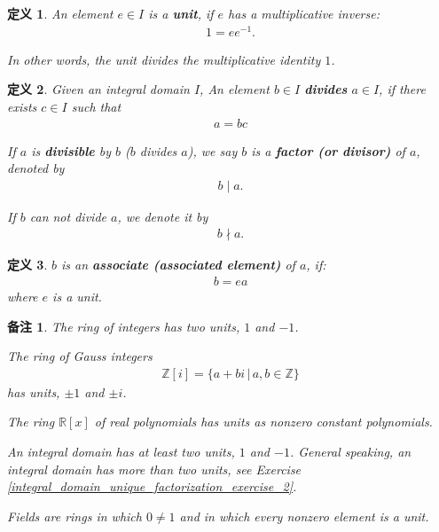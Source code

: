 \documentclass[utf8]{ctexbook}
\newtheorem{definition}{定义}[section]
\newtheorem{memo}{备注}[section]
\begin{document}
\begin{definition}\label{def_integral_domain_unit}
An element $e \in I$ is a \textbf{unit}, if $e$ has a multiplicative inverse:
\begin{align*}
1 = e e^{-1} .
\end{align*}

In other words, the unit divides the multiplicative identity $1$.

\end{definition}

\begin{definition}\label{def_integral_domain_divides}
Given an integral domain $I$, 
An element $b \in I$ \textbf{divides} $a \in I$, if there exists $c \in I$ such that
\begin{align*}
a = bc
\end{align*}

If $a$ is \textbf{divisible} by $b$ ($b$ divides $a$), we say $b$ is a \textbf{factor (or divisor)} of $a$, denoted by 
\begin{align*}
b \mid a .
\end{align*}

If $b$ can not divide $a$, we denote it by
\begin{align*}
b \nmid a .
\end{align*}
\end{definition}


\begin{definition}\label{def_integral_domain_associates}
$b$ is an \textbf{associate (associated element)} of $a$, if:
\begin{align*}
b = e a
\end{align*}
where $e$ is a unit.
\end{definition}

\begin{memo}
The ring of integers has two units, $1$ and $-1$.

The ring of Gauss integers
\begin{align*}
\mathbb{Z}[i] = \{ a + bi \, | \, a, b \in \mathbb{Z} \}
\end{align*}
has units, $\pm 1$ and $\pm i$.

The ring $\mathbb{R}[x]$ of real polynomials has units as nonzero constant polynomials.

An integral domain has at least two units, $1$ and $-1$. General speaking, an integral domain has more than two units, see Exercise \ref{integral_domain_unique_factorization_exercise_2}.

Fields are rings in which $0 \neq 1$ and in which every nonzero element is a unit.
\end{memo}
\end{document}
